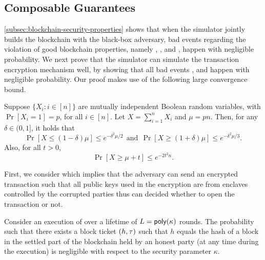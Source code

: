 \subsection{Composable Guarantees}
\label{subsec:composable-guarantees}

\cref{subsec:blockchain-security-properties} shows that when the simulator jointly builds the blockchain with the black-box adversary, bad events regarding the violation of good blockchain properties, namely \badCP, \badCQ, \badCG and \badProfile, happen with negligible probability.
%
We next prove that the simulator \simulator can simulate the transaction encryption mechanism well, by showing that all bad events \badTicket, \badNIZK and \badDec happen with negligible probability.
%
Our proof makes use of the following large convergence bound.

\begin{theorem}
	\label{thm:chernoff-bounds}

	Suppose $\{X_i: i \in [n]\}$ are mutually independent Boolean random variables, with $\Pr[X_i = 1] = p$, for all $i \in [n]$. Let $X =\sum^n_{i = 1} X_i$ and $\mu = pn$.
	Then, for any $\delta \in (0, 1]$, it holds that
	\[
		\Pr [X \le (1 - \delta) \mu] \le e^{- \delta^2 \mu / 2}
		~~\text{and}~~
		\Pr [X \ge (1 + \delta) \mu] \le e^{- \delta^2 \mu / 3}.
	\]
	Also, for all $t > 0$,
	\[ \Pr[X \ge \mu + t] \le e^{-2 t^2 n}. \]
\end{theorem}

First, we consider \badTicket which implies that the adversary \adv can send an encrypted transaction such that all public keys used in the encryption are from enclaves controlled by the corrupted parties thus \adv can decided whether to open the transaction or not.

\begin{lemma}
	\label{lemma:good-block-tickets}
	Consider an execution of \protocFairLedger over a lifetime of $L = \mathsf{poly}(\kappa)$ rounds.
	The probability such that there exists a block ticket $(h, \mathsf{\tau})$ such that $h$ equals the hash of a block in the settled part of the blockchain held by an honest party (at any time during the execution) is negligible with respect to the security parameter $\kappa$.
\end{lemma}

